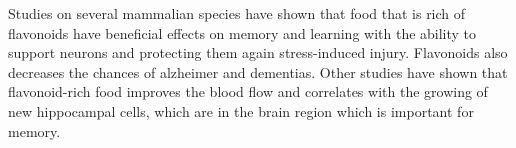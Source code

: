 Studies on several mammalian species have shown that food that is rich of flavonoids have beneficial effects on memory and learning with the ability to support neurons and protecting them again stress-induced injury.
Flavonoids also decreases the chances of alzheimer and dementias. Other studies have shown that flavonoid-rich food improves the blood flow and correlates with the growing of new hippocampal cells, which are in the brain region which is important for memory.






